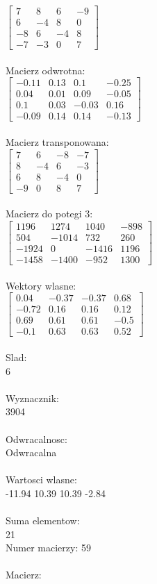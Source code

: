 \documentclass[a4paper,12pt]{article}
\begin{document}
$\begin{bmatrix} 7&8&6&-9\\6&-4&8&0\\-8&6&-4&8\\-7&-3&0&7 \end{bmatrix}$
\\
\\
Macierz odwrotna:\\

$\begin{bmatrix} -0.11&0.13&0.1&-0.25\\0.04&0.01&0.09&-0.05\\0.1&0.03&-0.03&0.16\\-0.09&0.14&0.14&-0.13 \end{bmatrix}$
\\
\\
Macierz transponowana:\\

$\begin{bmatrix} 7&6&-8&-7\\8&-4&6&-3\\6&8&-4&0\\-9&0&8&7 \end{bmatrix}$
\\
\\
Macierz do potegi 3:\\

$\begin{bmatrix} 1196&1274&1040&-898\\504&-1014&732&260\\-1924&0&-1416&1196\\-1458&-1400&-952&1300 \end{bmatrix}$
\\
\\
Wektory wlasne:\\

$\begin{bmatrix} 0.04&-0.37&-0.37&0.68\\-0.72&0.16&0.16&0.12\\0.69&0.61&0.61&-0.5\\-0.1&0.63&0.63&0.52 \end{bmatrix}$
\\
\\
Slad:\\
6
\\
\\
Wyznacznik:\\
3904
\\
\\
Odwracalnosc:\\
Odwracalna
\\
\\
Wartosci wlasne:\\
-11.94 10.39 10.39 -2.84
\\
\\
Suma elementow:\\
21
\\
\newpage
Numer macierzy:
59
\\
\\
Macierz:\\
\end{document}
